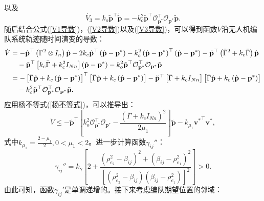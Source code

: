 以及
\begin{equation}
	\dot{V_3} = 
	k_o \tilde{\mathbf{p}}^\top \dot{\tilde{\mathbf{p}}} = 
	-k_o^2 \tilde{\mathbf{p}}^\top \mathcal{O}_{\mathbf{p}^*}^\top
	\mathcal{O}_{\mathbf{p}^*} \tilde{\mathbf{p}}.
	\label{V3导数}
\end{equation}
随后结合公式(\ref{V1导数})，(\ref{V2导数})以及(\ref{V3导数})，可以得到函数$V$沿无人机编队系统轨迹随时间演变的导数：
\begin{align}
	\dot{V} &= -\hat{\mathbf{p}}^\top \left( {\Gamma}^2 \otimes I_n \right) \hat{\mathbf{p}} - 2k_c \hat{\mathbf{p}}^\top \left( \hat{\mathbf{p}} - \mathbf{p}^* \right) - k_c^2 \left( \hat{\mathbf{p}} - \mathbf{p}^* \right)^\top \left( \hat{\mathbf{p}} - \mathbf{p}^* \right) - \tilde{\mathbf{p}}^\top \left( \bar{\Gamma}^2 + k_c \bar{\Gamma} \right) \hat{\mathbf{p}} \notag \\
	&\quad - \tilde{\mathbf{p}}^\top \left[ k_c \bar{\Gamma} + k_c^2 I_{Nn} \right] \left( \hat{\mathbf{p}} - \mathbf{p}^* \right) - k_o^2 \tilde{\mathbf{p}}^\top \mathcal{O}_{\mathbf{p}^*}^\top \mathcal{O}_{\mathbf{p}^*} \tilde{\mathbf{p}} \notag \\
	&= - \left[ \bar{\Gamma} \hat{\mathbf{p}} + k_c \left( \hat{\mathbf{p}} - \mathbf{p}^* \right) \right]^\top \left[ \bar{\Gamma} \hat{\mathbf{p}} + k_c \left( \hat{\mathbf{p}} - \mathbf{p}^* \right) \right] - \tilde{\mathbf{p}}^\top \left[ \bar{\Gamma} + k_c I_{Nn} \right] \left[ \bar{\Gamma} \hat{\mathbf{p}} + k_c \left( \hat{\mathbf{p}} - \mathbf{p}^* \right) \right] \notag \\
	&\quad - k_o^2 \tilde{\mathbf{p}}^\top \mathcal{O}_{\mathbf{p}^*}^\top \mathcal{O}_{\mathbf{p}^*} \tilde{\mathbf{p}}.
	\end{align}
应用杨不等式(\ref{杨不等式})，可以推导出：
\begin{equation}
	\dot{V} \le -\tilde{\mathbf{p}}^\top 
	\left[
		k_o^2 \mathcal{O}_{\mathbf{p}^*}^\top \mathcal{O}_{\mathbf{p}^*}
		-\frac{(\bar{\Gamma}+k_c I_{Nn})^2}
		{2 \mu_1}	
	\right]
	\tilde{\mathbf{p}}
	-k_{\mu_1} {\mathbf{v}^*}^\top {\mathbf{v}^*},
	\label{不等式2}
\end{equation}
式中$k_{\mu_1}=\frac{2-\mu_1}{2},0<\mu_1<2$。进一步计算函数$\gamma_{ij}''$：
\begin{equation}
	\gamma_{ij}'' = k_\gamma
	\left[
		2+\frac{(\rho_{e_2}^2-\beta_{ij})^2+(\beta_{ij}-\rho_{e_1}^2)^2}
		{[(\rho_{e_2}^2-\beta_{ij})(\beta_{ij}-\rho_{e_1}^2)]^2}
	\right]
	>0.
\end{equation}
由此可知，函数$\gamma_{ij}'$是单调递增的。接下来考虑编队期望位置的邻域：
